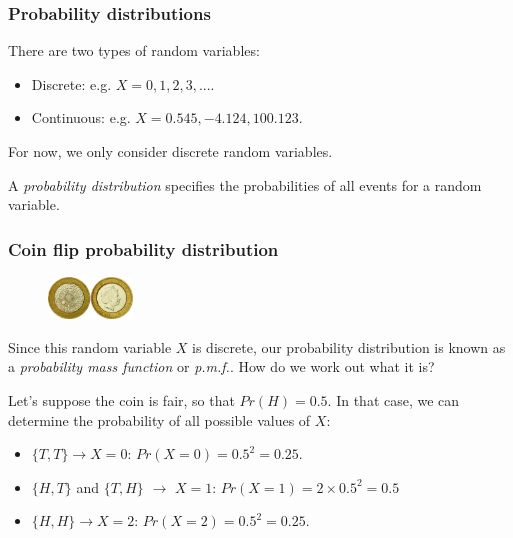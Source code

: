 \documentclass{beamer}
\begin{document}
	\begin{frame}
		\frametitle{Probability distributions}
		
		There are two types of random variables:
		
		\begin{itemize}
			\item Discrete: e.g. $X=0, 1, 2, 3, ...$.
			\item Continuous: e.g. $X=0.545, -4.124, 100.123$.
		\end{itemize}
		
		For now, we only consider discrete random variables.
		
		\vspace{0.5cm}
		
		A \textit{probability distribution} specifies the probabilities of all events for a random variable.
		
	\end{frame}
	
	\begin{frame}
		\frametitle{Coin flip probability distribution}
		
		\begin{figure}[ht]
			\includegraphics[width=0.2\textwidth]{./figures/coins.jpeg}
		\end{figure}
		
		Since this random variable $X$ is discrete, our probability distribution is known as a \textit{probability mass function} or \textit{p.m.f.}. How do we work out what it is?
		
		\vspace{0.5cm}
		
		Let's suppose the coin is fair, so that $Pr(H) = 0.5$. In that case, we can determine the probability of all possible values of $X$:
		
		\begin{itemize}
			\item $\{T,T\}\rightarrow X=0$: $Pr(X=0) = 0.5^2 = 0.25$.
			\item $\{H,T\}$ and $\{T,H\}$ $\rightarrow$ $X=1$: $Pr(X = 1) = 2 \times 0.5^2 = 0.5$
			\item $\{H,H\} \rightarrow X=2$: $Pr(X=2) = 0.5^2 = 0.25$.
		\end{itemize}
		
	\end{frame}
	
\end{document}
